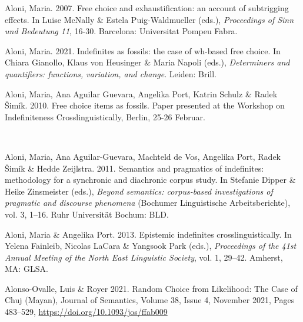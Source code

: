 \begin{styleStandard}
Aloni, Maria. 2007. Free choice and exhaustification: an account of subtrigging effects. In Luise McNally \& Estela Puig-Waldmueller (eds.), \textit{Proceedings of Sinn und Bedeutung 11}, 16-30. Barcelona: Universitat Pompeu Fabra.
\end{styleStandard}

\begin{styleDLiteratur}
Aloni, Maria. 2021. Indefinites as fossils: the case of wh-based free choice. In Chiara Gianollo, Klaus von Heusinger \& Maria Napoli (eds.), \textit{Determiners and quantifiers: functions, variation, and change}. Leiden: Brill.
\end{styleDLiteratur}

\begin{styleStandard}
Aloni, Maria, Ana Aguilar Guevara, Angelika Port, Katrin Schulz \& Radek Šimík. 2010. Free choice items as fossils. Paper presented at the Workshop on Indefiniteness Crosslinguistically, Berlin, 25-26 Februar. 
\end{styleStandard}

\begin{styleStandard}
\ \ 
\end{styleStandard}

\begin{styleStandard}
Aloni, Maria, Ana Aguilar-Guevara, Machteld de Vos, Angelika Port, Radek Šimík \& Hedde Zeijlstra. 2011. Semantics and pragmatics of indefinites: methodology for a synchronic and diachronic corpus study. In Stefanie Dipper \& Heike Zinsmeister (eds.), \textit{Beyond semantics: corpus-based investigations of pragmatic and discourse phenomena} (Bochumer Linguistische Arbeitsberichte), vol. 3, 1–16. Ruhr Universität Bochum: BLD.
\end{styleStandard}

\begin{styleStandard}
Aloni, Maria \& Angelika Port. 2013. Epistemic indefinites crosslinguistically. In Yelena Fainleib, Nicolas LaCara \& Yangsook Park (eds.), \textit{Proceedings of the 41st Annual Meeting of the North East Linguistic Society}, vol. 1, 29–42. Amherst, MA: GLSA.
\end{styleStandard}

\begin{styleStandard}
Alonso-Ovalle, Luis \& Royer 2021. Random Choice from Likelihood: The Case of Chuj (Mayan), Journal of Semantics, Volume 38, Issue 4, November 2021, Pages 483–529, \url{https://doi.org/10.1093/jos/ffab009}
\end{styleStandard}

